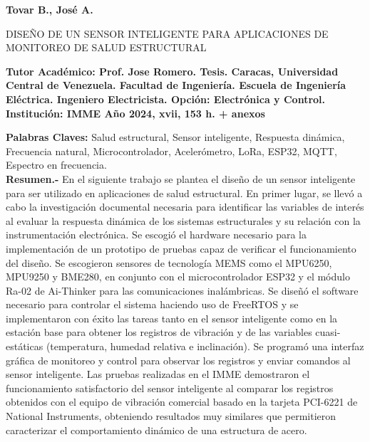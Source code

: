 \documentclass[letterpaper,titlepage,12pt,oneside,spanish,final]{report_eie}
\begin{document}
\newpage
\renewcommand*{\abstract}{\begin{center}\end{center}}
\begin{spacing}{1}
\begin{center}%

\textbf{Tovar B., José A.}

\begin{large}
DISEÑO DE UN SENSOR INTELIGENTE PARA APLICACIONES DE MONITOREO DE SALUD ESTRUCTURAL
\end{large}
\end{center}

\noindent%
\textbf{Tutor Académico: Prof. Jose Romero. Tesis.
Caracas, Universidad Central de Venezuela. Facultad de Ingeniería.
Escuela de Ingeniería Eléctrica. Ingeniero Electricista. Opción: Electrónica y Control. Institución: IMME Año 2024,
xvii, 153 h. + anexos}

\noindent
\textbf{Palabras Claves:} Salud estructural, Sensor inteligente,  Respuesta dinámica, Frecuencia natural, Microcontrolador, Acelerómetro, LoRa, ESP32, MQTT, Espectro en frecuencia. \\[1ex]

\noindent \textbf{Resumen.-} En el siguiente trabajo se plantea el diseño de un sensor inteligente para ser utilizado en aplicaciones de salud estructural. En primer lugar, se llevó a cabo la investigación documental necesaria para identificar las variables de interés al evaluar la respuesta dinámica de los sistemas estructurales y su relación con la instrumentación electrónica. Se escogió el hardware necesario para la implementación de un prototipo de pruebas capaz de verificar el funcionamiento del diseño. Se escogieron sensores de tecnología MEMS como el MPU6250, MPU9250 y BME280, en conjunto con el microcontrolador ESP32 y el módulo Ra-02 de Ai-Thinker para las comunicaciones inalámbricas. Se diseñó el software necesario para controlar el sistema haciendo uso de FreeRTOS y se implementaron con éxito las tareas tanto en el sensor inteligente como en la estación base para obtener los registros de vibración y de las variables cuasi-estáticas (temperatura, humedad relativa e inclinación). Se programó una interfaz gráfica de monitoreo y control para observar los registros y enviar comandos al sensor inteligente. Las pruebas realizadas en el IMME demostraron el funcionamiento satisfactorio del sensor inteligente al comparar los registros obtenidos con el equipo de vibración comercial basado en la tarjeta PCI-6221 de National Instruments, obteniendo resultados muy similares que permitieron caracterizar el comportamiento dinámico de una estructura de acero.

\end{spacing}
\end{document}
